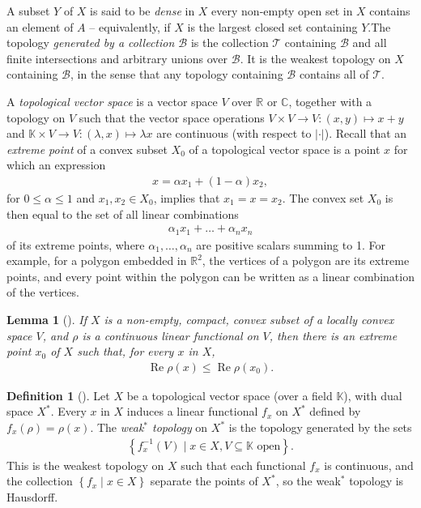 \documentclass[11pt,a4paper]{report}
\theoremstyle{plain}
\newtheorem{lemma}{Lemma}
\theoremstyle{definition}
\newtheorem*{defn*}{Definition}
\newcommand{\1}{\mathbbm{1}}
\newcommand{\C}{\mathbb{C}}
\newcommand{\R}{\mathbb{R}}
\newcommand{\B}{\mathcal{B}}
\newcommand{\T}{\mathcal{T}}
\DeclareMathOperator{\Real}{\operatorname{Re}}
\begin{document}
A subset $Y$ of $X$ is said to be \emph{dense} in $X$ every non-empty open set 
in $X$ contains an element of $A$ -- equivalently, if $X$ is the largest closed 
set containing $Y$.The topology \emph{generated by a collection $\B$} is the 
collection $\T$ containing $\B$ and all finite intersections and arbitrary 
unions over $\B$. It is the weakest topology on $X$ containing $\B$, in the 
sense that any topology containing $\B$ contains all of $\T$.

A \emph{topological vector space} is a vector space $V$ over $\R$ or $\C$, 
together with a topology on $V$ such that the vector space operations $V\times 
V\to V:(x,y)\mapsto x+y$ and $\mathbb{K}\times V\to V:(\lambda,x)\mapsto \lambda 
x$ are continuous (with respect to $\left|\cdot\right|$). Recall that an 
\emph{extreme point} of a convex subset $X_0$ of a topological vector space is a 
point $x$ for which an expression
\begin{align*}
	x = \alpha x_1 +(1-\alpha)x_2,
\end{align*}
for $0\leq\alpha\leq1$ and $x_1,x_2\in X_0$, implies that $x_1=x=x_2$. 
The convex set $X_0$ is then equal to the set of all linear combinations
\begin{align*}
	\alpha_1 x_1+\dots +\alpha_n x_n
\end{align*}
of its extreme points, where $\alpha_1,\dots,\alpha_n$ are positive scalars 
summing to 1. For example, for a polygon embedded in $\R^2$, the vertices of a 
polygon are its extreme points, and every point within the polygon can be 
written as a linear combination of the vertices.


\begin{lemma}[{\cite[1.4.4]{kadison83}}]\label{lemma:144}
If $X$ is a non-empty, compact, convex subset of a locally convex space $V$, and 
$\rho$ is a continuous linear functional on $V$, then there is an extreme point 
$x_0$ of $X$ such that, for every $x$ in $X$,
	\begin{align*}
		\Real\rho(x) \leq \Real\rho(x_0).
	\end{align*}
\end{lemma}

\begin{defn*}[{\cite[3.14]{rudin91}}]
	Let $X$ be a topological vector space (over a field $\mathbb K$), with dual 
	space $X^\ast$. Every $x$ in $X$ induces a linear functional $f_x$ on $X^\ast$ 
	defined by $f_x(\rho)=\rho(x)$. The \emph{weak$^\ast$ topology} on $X^\ast$ is 
	the topology generated by the sets 
	\begin{align*}
		\left\{f^{-1}_x(V) \mid x \in X, V\subseteq \mathbb K \mbox{ open}\right\}.
	\end{align*}
	This is the weakest topology on $X$ such that each functional $f_x$ is 
	continuous, and the collection $\left\{f_x \mid x\in X\right\}$ separate the 
	points of $X^\ast$, so the weak$^\ast$ topology is Hausdorff.
\end{defn*}
\end{document}
